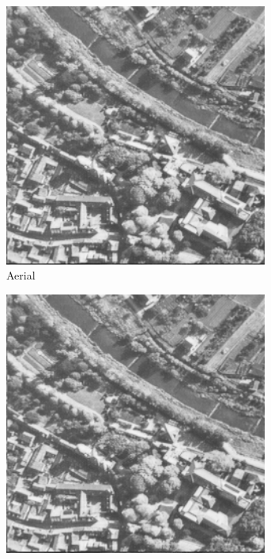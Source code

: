 \begin{figure}
\centering
\begin{subfigure}[b]{.23\textwidth}
  \centering
  \includegraphics[width=0.95\textwidth]{figures/test-images/original/aerial}
  \caption{Aerial}
  \label{fig:test-images-aerial}
\end{subfigure}
\begin{subfigure}[b]{.23\textwidth}
  \centering
  \includegraphics[width=0.95\textwidth]{figures/test-images/truncate1/aerial}

\end{subfigure}
\end{figure}

